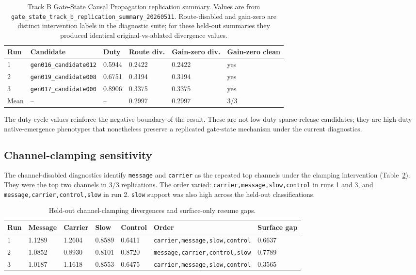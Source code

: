 \documentclass[11pt]{article}
\begin{document}
\begin{table}[t]
\centering
\caption{Track B Gate-State Causal Propagation replication summary. Values are
from \texttt{gate\_state\_track\_b\_replication\_summary\_20260511}.
Route-disabled and gain-zero are distinct intervention labels in the
diagnostic suite; for these held-out summaries they produced identical
original-vs-ablated divergence values.}
\label{tab:replication}
\begin{tabular}{llllll}
\toprule
Run & Candidate & Duty & Route div. & Gain-zero div. & Gain-zero clean \\
\midrule
1 & \texttt{gen016\_candidate012} & 0.5944 & 0.2422 & 0.2422 & yes \\
2 & \texttt{gen019\_candidate008} & 0.6751 & 0.3194 & 0.3194 & yes \\
3 & \texttt{gen017\_candidate000} & 0.8906 & 0.3375 & 0.3375 & yes \\
\midrule
Mean & -- & -- & 0.2997 & 0.2997 & 3/3 \\
\bottomrule
\end{tabular}
\end{table}

The duty-cycle values reinforce the negative boundary of the result. These are
not low-duty sparse-release candidates; they are high-duty native-emergence
phenotypes that nonetheless preserve a replicated gate-state mechanism under
the current diagnostics.

\subsection{Channel-clamping sensitivity}

The channel-disabled diagnostics identify \texttt{message} and
\texttt{carrier} as the repeated top channels under the clamping intervention
(Table~\ref{tab:channels}).
They were the top two channels in 3/3 replications. The order varied:
\texttt{carrier,message,slow,control} in runs 1 and 3, and
\texttt{message,carrier,control,slow} in run 2. \texttt{slow} support was also
high across the held-out classifications.

\begin{table}[t]
\centering
\caption{Held-out channel-clamping divergences and surface-only resume gaps.}
\label{tab:channels}
\begin{tabular}{lllllll}
\toprule
Run & Message & Carrier & Slow & Control & Order & Surface gap \\
\midrule
1 & 1.1289 & 1.2604 & 0.8589 & 0.6411 &
\texttt{carrier,message,slow,control} & 0.6637 \\
2 & 1.0852 & 0.8930 & 0.8101 & 0.8720 &
\texttt{message,carrier,control,slow} & 0.7789 \\
3 & 1.0187 & 1.1618 & 0.8553 & 0.6475 &
\texttt{carrier,message,slow,control} & 0.3565 \\
\bottomrule
\end{tabular}
\end{table}
\end{document}

